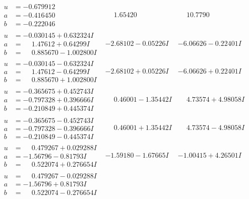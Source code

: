 \documentclass[1p]{elsarticle_modified}
\theoremstyle{definition}
\begin{document}
$$\begin{array}{c|c|c}
\begin{aligned}
u &= -0.679912\phantom{ +0.000000I} \\
a &= -0.416450\phantom{ +0.000000I} \\
b &= -0.222046\phantom{ +0.000000I}\end{aligned}
 & \phantom{-}1.65420\phantom{ +0.000000I} & \phantom{-}10.7790\phantom{ +0.000000I} \\ \hline\begin{aligned}
u &= -0.030145 + 0.632324 I \\
a &= \phantom{-}1.47612 + 0.64299 I \\
b &= \phantom{-}0.885670 - 1.002800 I\end{aligned}
 & -2.68102 - 0.05226 I & -6.06626 - 0.22401 I \\ \hline\begin{aligned}
u &= -0.030145 - 0.632324 I \\
a &= \phantom{-}1.47612 - 0.64299 I \\
b &= \phantom{-}0.885670 + 1.002800 I\end{aligned}
 & -2.68102 + 0.05226 I & -6.06626 + 0.22401 I \\ \hline\begin{aligned}
u &= -0.365675 + 0.452743 I \\
a &= -0.797328 + 0.396666 I \\
b &= -0.210849 + 0.445374 I\end{aligned}
 & \phantom{-}0.46001 - 1.35442 I & \phantom{-}4.73574 + 4.98058 I \\ \hline\begin{aligned}
u &= -0.365675 - 0.452743 I \\
a &= -0.797328 - 0.396666 I \\
b &= -0.210849 - 0.445374 I\end{aligned}
 & \phantom{-}0.46001 + 1.35442 I & \phantom{-}4.73574 - 4.98058 I \\ \hline\begin{aligned}
u &= \phantom{-}0.479267 + 0.029288 I \\
a &= -1.56796 - 0.81793 I \\
b &= \phantom{-}0.522074 + 0.276654 I\end{aligned}
 & -1.59180 - 1.67665 I & -1.00415 + 4.26501 I \\ \hline\begin{aligned}
u &= \phantom{-}0.479267 - 0.029288 I \\
a &= -1.56796 + 0.81793 I \\
b &= \phantom{-}0.522074 - 0.276654 I\end{aligned}

\end{array}$$
\end{document}
